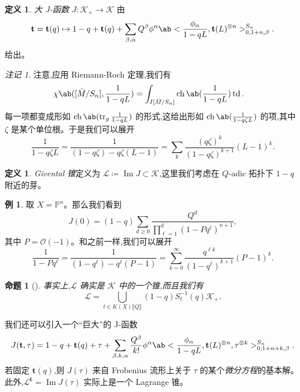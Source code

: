 \documentclass{amsart}
\newtheorem{prop}[thm]{命题}
\theoremstyle{definition}
\newtheorem{defn}[thm]{定义}
\newtheorem{exm}[thm]{例}
\theoremstyle{remark}
\newtheorem{rmk}[thm]{注记}
\theoremstyle{plain}
\theoremstyle{definition}
\theoremstyle{remark}
\DeclareMathOperator{\Ima}{Im}
\renewcommand{\P}{\mathbb{P}}
\newcommand{\mc}[1]{\mathcal{#1}}
\newcommand{\on}[1]{\operatorname{#1}}
\newcommand{\1}{\mathbf{1}}
\newcommand{\2}{\mathbf{2}}
\newcommand{\3}{\mathbf{3}}
\newcommand{\ps}[1]{\llbracket #1 \rrbracket}
\begin{document}
\begin{defn}
    \textit{大 J-函数} \(J \colon \mc{K}_+ \to \mc{K}\) 由
    \[ \mathbf{t} = \mathbf{t}(q) \mapsto 1 - q + \mathbf{t}(q) + \sum_{\beta, \alpha} Q^{\beta} \phi^{\alpha} \ab< \frac{\phi_{\alpha}}{1-qL}, \mathbf{t}(L)^{\otimes n}>_{0, 1+n, \beta}^{S_n}. \]
    给出。
\end{defn}

\begin{rmk}
    注意,应用 Riemann-Roch 定理,我们有
    \begin{align*}
        \chi\ab([\bar{M}/S_n], \frac{1}{1-qL}) &= \int_{I[\bar{M}/S_n]} \on{ch}\ab(\frac{1}{1-qL}) \on{td}.
    \end{align*}
    每一项都变成形如 \(\on{ch}\ab(\on{tr}_g \frac{1}{1-qL})\) 的形式,这给出形如 \(\on{ch}\ab(\frac{1}{1-q\zeta L})\) 的项,其中 \(\zeta\) 是某个单位根。于是我们可以展开
    \[ \frac{1}{1-q\zeta L} = \frac{1}{(1-q \zeta) - q\zeta (L-1)} = \sum_k \frac{(q\zeta)^k}{(1-q\zeta)^{k+1}}(L-1)^k. \]
\end{rmk}

\begin{defn}
    \textit{Givental 锥}定义为 \(\mc{L} \coloneqq \Ima J \subset \mc{K}\),这里我们考虑在 \(Q\)-adic 拓扑下 \(1-q\) 附近的芽。
\end{defn}

\begin{exm}
    取 \(X = \P^n\)。那么我们看到
    \[ J(0) = (1-q) \sum_{d \geq 0} \frac{Q^d}{\prod_{\ell=1}^d (1-Pq^{\ell})^{n+1}}, \]
    其中 \(P = \mc{O}(-1)\)。和之前一样,我们可以展开
    \[ \frac{1}{1-P q^{\ell}} = \frac{1}{(1-q^{\ell}) - q^{\ell}(P-1)} = \sum_{k=0}^{\infty} \frac{q^{\ell k}}{(1-q^{\ell})^{k+1}}(P-1)^k. \]
\end{exm}

\begin{prop}[{\cite{GiventalK7}}]
    事实上,\(\mc{L}\) 确实是 \(\mc{K}\) 中的一个锥,而且我们有
    \[ \mc{L} = \bigcup_{t \in K(X)\ps{Q}} (1-q) S_{t}^{-1}(q) \mc{K}_+. \]
\end{prop}

我们还可以引入一个``巨大''的 J-函数
\[ J(\mathbf{t}, \tau) = 1-q + \mathbf{t}(q) + \tau + \sum_{\beta, k, \alpha} \frac{Q^{\beta}}{k!} \phi^{\alpha} \ab< \frac{\phi_{\alpha}}{1-qL}, \mathbf{t}(L)^{\otimes n}, \tau^{\otimes k}>_{0,1+n+k,\beta}^{S_n}. \]
若固定 \(\mathbf{t}(q)\),则 \(J(\tau)\) 来自 Frobenius 流形上关于 \(\tau\) 的某个\textit{微分方程}的基本解。此外,\(\mc{L}^{\mathbf{t}}=  \Ima J(\tau)\) 实际上是一个 Lagrange 锥。
\end{document}

